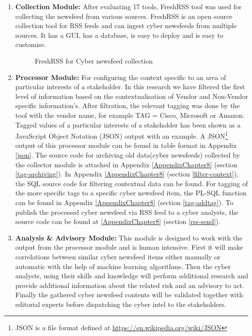 \begin{enumerate}
    \item \textbf{Collection Module:} 
    After evaluating 17 tools, 
    FreshRSS tool was used for collecting the newsfeed from various sources. 
    FreshRSS is an open source collection tool for RSS feeds and 
    can ingest cyber newsfeeds from multiple sources. 
    It has a GUI, has a database, is easy to deploy and is easy to customise.  

    \begin{figure}[ht]
    \centering
        \caption{FreshRSS for Cyber newsfeed collection }
        \label{fig:freshrss}
    \end{figure}

    \item  \textbf{Processor Module: }
    For configuring the context specific to an area of particular interests of a stakeholder. 
    In this research we have filtered the first level of information 
    based on the contextualisation of Vendor and Non-Vendor specific information's.
    After filtration, 
    the relevant tagging was done by the tool with the vendor name, 
    for example TAG = Cisco, Microsoft or Amazon. 
    Tagged values of a particular interests of a stakeholder has been shown as a JavaScript Object Notation (JSON)  output with an example. 
    A JSON\footnote{JSON is a file format defined at \url{https://en.wikipedia.org/wiki/JSON}} 
    output of this processor module can be found
    in table format in Appendix \ref{json}. 
    The source code for archiving old data(cyber newsfeeds) collected  by the collector module is attached in Appendix \ref{AppendixChapter8} (section \ref{tag-archiving}).
    In Appendix \ref{AppendixChapter8} (section \ref{filter-context}), the SQL source code for filtering contextual data can be found. 
    For tagging of the more specific tags to a specific cyber newsfeed item, the PL-SQL function can be found in Appendix \ref{AppendixChapter8} (section \ref{tag-addtag}).
    To publish the processed cyber newsfeed via RSS feed to a cyber analysts, the source code can be found at \ref{AppendixChapter8} (section \ref{rss-send}).
    
    \item  \textbf{Analysis \& Advisory Module:}
    This module is designed to work with the output from the processor module and is human intensive. 
    First it will make correlations between similar cyber newsfeed items 
    either manually or automatic with the help of machine learning algorithms. 
    Then the cyber analysts, 
    using their skills and knowledge will perform additional research and provide additional information about the related risk and an advisory to act. 
     Finally the gathered cyber newsfeed contents will be validated together with editorial experts before dispatching the cyber intel to the stakeholders.

 \end{enumerate}


